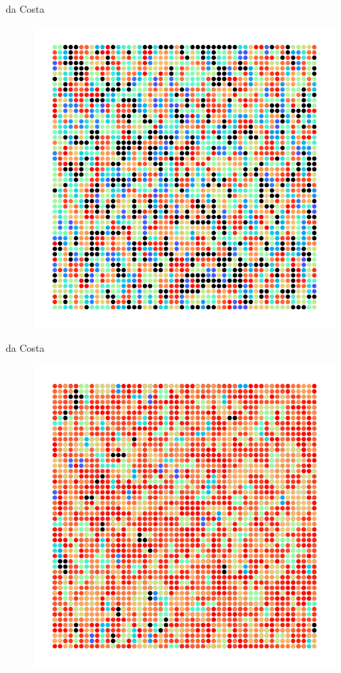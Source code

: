 \documentclass{beamer}
\begin{document}
\begin{frame}{da Costa}
        \begin{figure}[H]
                \centering
                \includegraphics[scale=0.7]{fig/exp-precrit.pdf}
        \end{figure}
\end{frame}
\begin{frame}{da Costa}
        \begin{figure}[H]
                \centering
                \includegraphics[scale=0.7]{fig/exp-crit.pdf}
        \end{figure}
\end{frame}
\end{document}
